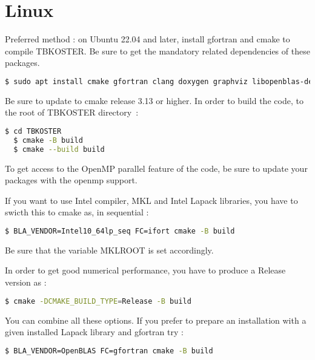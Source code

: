 \documentclass[12pt, onecolumn]{memoir}
\begin{document}
\section{Linux}
Preferred method : on Ubuntu 22.04 and later, install gfortran and cmake to compile TBKOSTER. Be sure to get the mandatory related dependencies of these packages.
\begin{lstlisting}[language=sh,basicstyle=\small\ttfamily,frame=single,breaklines=true]
$ sudo apt install cmake gfortran clang doxygen graphviz libopenblas-dev libomp-dev texlive-latex-base texlive-latex-extra texlive-bibtex-extra tex4ht biber
\end{lstlisting}
Be sure to update to cmake release 3.13 or higher.
In order to build the code, to the root of TBKOSTER directory~:
\begin{lstlisting}[language=sh,basicstyle=\small\ttfamily,frame=single]
  $ cd TBKOSTER
  $ cmake -B build
  $ cmake --build build
\end{lstlisting}
To get access to the OpenMP parallel feature of the code, be sure to update your packages with the openmp support.

If you want to use Intel compiler, MKL and Intel Lapack libraries, you have to swicth this to cmake as, in sequential :
\begin{lstlisting}[language=sh,basicstyle=\small\ttfamily]
$ BLA_VENDOR=Intel10_64lp_seq FC=ifort cmake -B build
\end{lstlisting}
Be sure that the variable MKLROOT is set accordingly.

In order to get good numerical performance, you have to produce a Release version as :
\begin{lstlisting}[language=sh,basicstyle=\small\ttfamily]
$ cmake -DCMAKE_BUILD_TYPE=Release -B build
\end{lstlisting}
You can combine all these options.
If you prefer to prepare an installation with a given installed Lapack library and gfortran try :
\begin{lstlisting}[language=sh,basicstyle=\small\ttfamily]
$ BLA_VENDOR=OpenBLAS FC=gfortran cmake -B build
\end{lstlisting}
\end{document}
